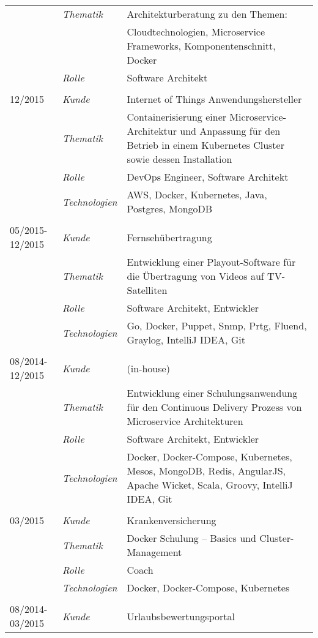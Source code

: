 \begin{longtable}{@{}>{}p{4cm}>{\itshape}p{2cm}>{}p{9cm}}
\nopagebreak		& Thematik	    & Architekturberatung zu den Themen:\\
\nopagebreak		&           	& Cloudtechnologien, Microservice Frameworks, Komponentenschnitt, Docker\\
\nopagebreak		& Rolle 	    & Software Architekt\\
\\
12/2015             & Kunde 	    & Internet of Things Anwendungshersteller\\
\nopagebreak		& Thematik	    & Containerisierung einer Microservice-Architektur und Anpassung für den Betrieb in einem Kubernetes Cluster sowie dessen Installation\\
\nopagebreak		& Rolle 	    & DevOps Engineer, Software Architekt\\
\nopagebreak		& Technologien	& AWS, Docker, Kubernetes, Java, Postgres, MongoDB\\
\\
05/2015-12/2015     & Kunde 	    & Fernsehübertragung\\
\nopagebreak		& Thematik	    & Entwicklung einer Playout-Software für die Übertragung von Videos auf TV-Satelliten\\
\nopagebreak		& Rolle 	    & Software Architekt, Entwickler\\
\nopagebreak		& Technologien	& Go, Docker, Puppet, Snmp, Prtg, Fluend, Graylog, IntelliJ IDEA, Git\\
\\
08/2014-12/2015     & Kunde 	    & (in-house)\\
\nopagebreak		& Thematik	    & Entwicklung einer Schulungsanwendung für den Continuous Delivery Prozess von Microservice Architekturen\\
\nopagebreak		& Rolle 	    & Software Architekt, Entwickler\\
\nopagebreak		& Technologien	& Docker, Docker-Compose, Kubernetes, Mesos, MongoDB, Redis, AngularJS, Apache Wicket, Scala, Groovy, IntelliJ IDEA, Git\\
\\
03/2015             & Kunde 	    & Krankenversicherung\\
\nopagebreak		& Thematik	    & Docker Schulung – Basics und Cluster-Management\\
\nopagebreak		& Rolle 	    & Coach\\
\nopagebreak		& Technologien	& Docker, Docker-Compose, Kubernetes\\
\\
08/2014-03/2015     & Kunde 	    & Urlaubsbewertungsportal\\

\end{longtable}
